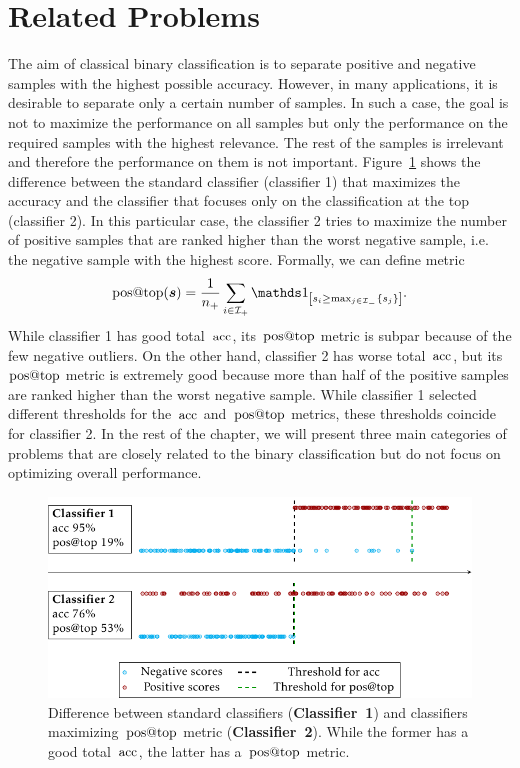 
\section{Related Problems}\label{sec: related problems}

The aim of classical binary classification is to separate positive and negative samples with the highest possible accuracy. However, in many applications, it is desirable to separate only a certain number of samples. In such a case, the goal is not to maximize the performance on all samples but only the performance on the required samples with the highest relevance. The rest of the samples is irrelevant and therefore the performance on them is not important. Figure~\ref{fig: standard vs. aatp} shows the difference between the standard classifier (classifier 1) that maximizes the accuracy and the classifier that focuses only on the classification at the top (classifier 2). In this particular case, the classifier 2 tries to maximize the number of positive samples that are ranked higher than the worst negative sample, i.e. the negative sample with the highest score. Formally, we can define metric
\begin{equation*}
  \postop(\bm{s}) = \frac{1}{\npos} \sum_{i \in \Ipos} \Iverson{s_i \geq \max_{j \in \Ineg}\{s_j\}}.
\end{equation*}
While classifier 1 has good total~$\operatorname{acc}$, its~$\operatorname{pos@top}$ metric is subpar because of the few negative outliers. On the other hand, classifier 2 has worse total~$\operatorname{acc}$, but its~$\operatorname{pos@top}$ metric is extremely good because more than half of the positive samples are ranked higher than the worst negative sample. While classifier 1 selected different thresholds for the~$\operatorname{acc}$ and~$\operatorname{pos@top}$ metrics, these thresholds coincide for classifier 2. In the rest of the chapter, we will present three main categories of problems that are closely related to the binary classification but do not focus on optimizing overall performance.

\begin{figure}[t]
  \centering
  \includegraphics{images/standard_aatp_comparison.pdf}
  \caption{Difference between standard classifiers (\textbf{Classifier~1}) and classifiers maximizing~$\operatorname{pos@top}$ metric (\textbf{Classifier~2}). While the former has a good total~$\operatorname{acc}$, the latter has a~$\operatorname{pos@top}$ metric.}
  \label{fig: standard vs. aatp}
\end{figure}

